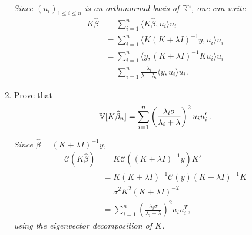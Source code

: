 \documentclass[a4paper,10pt,fleqn]{article}
\newcommand{\eqsp}{\,}
\newcommand{\R}{\ensuremath{\mathbb{R}}}
\newcommand{\V}{\ensuremath{\mathbb{V}}}
\newcommand{\1}{\ensuremath{\mathbbm{1}}}
\newcommand{\C}{\mathcal{C}}
\begin{document}
\begin{enumerate}
\vspace{.2cm}

{\em
Since $(u_i)_{1 \leq i \leq n}$ is an orthonormal basis of $\R^n$, one can write  
		\begin{align*}
			K \widehat{\beta} & = \sum_{i=1}^n \langle K \widehat{\beta}, u_i\rangle u_i\\
			& = \sum_{i=1}^n \langle K (K+\lambda I)^{-1}y, u_i\rangle u_i\\
			& = \sum_{i=1}^n \langle y, (K+\lambda I)^{-1} K  u_i\rangle u_i\\
			& = \sum_{i=1}^n \frac{\lambda_i }{\lambda + \lambda_i} \langle y, u_i \rangle u_i.
		\end{align*}
}
\item Prove that
$$
\V[K\widehat \beta_n]=\sum_{i=1}^n \left(\lambda_{i}\sigma\over \lambda_{i}+\lambda\right)^2u_{i}u_{i}'\eqsp.
$$

\vspace{.2cm}

{\em
Since $\widehat{\beta} = (K + \lambda I)^{-1}y$, 
		\begin{align*}
			\C (K \widehat{\beta}) & = K \C \left( (K + \lambda I)^{-1} y \right) K'\\
			& = K (K + \lambda I)^{-1} \C (y) (K + \lambda I)^{-1} K\\
			& = \sigma^2 K^2 (K + \lambda I)^{-2}\\
			& = \sum_{i=1}^n \left( \frac{\lambda_i \sigma }{\lambda_i + \lambda}\right)^2 u_i u_i^T,
		\end{align*}
	using the eigenvector decomposition of $K$.
}
\end{enumerate}
\end{document}
